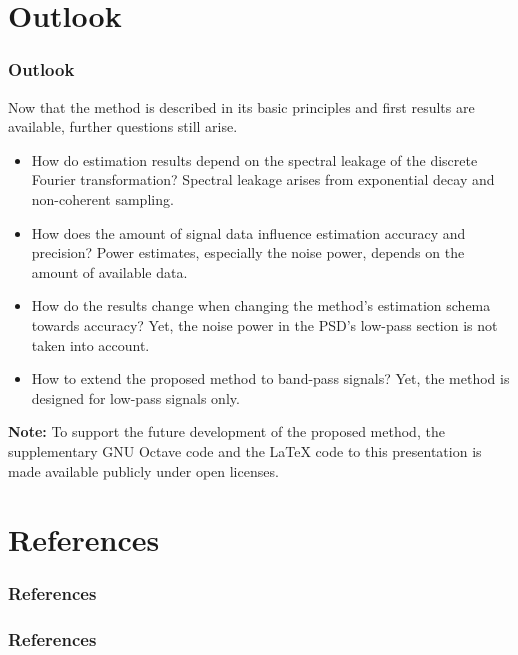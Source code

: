 \documentclass[11pt,aspectratio=169]{beamer}
\begin{document}
	\section{Outlook}
	\begin{frame}
		\frametitle{Outlook}
		Now that the method is described in its basic principles and first results are available, further questions still arise.
		\begin{itemize}
			\item How do estimation results depend on the spectral leakage of the discrete Fourier transformation? Spectral leakage arises from exponential decay and non-coherent sampling.
			\item How does the amount of signal data influence estimation accuracy and precision? Power estimates, especially the noise power, depends on the amount of available data.
			\item How do the results change when changing the method's estimation schema towards accuracy? Yet, the noise power in the PSD's low-pass section is not taken into account.
			\item How to extend the proposed method to band-pass signals? Yet, the method is designed for low-pass signals only.
		\end{itemize}
		\vspace*{.5em}
		\small \textbf{Note:} To support the future development of the proposed method, the supplementary GNU Octave code\autocite{progcode} and the \LaTeX{} code\autocite{texcode} to this presentation is made available publicly under open licenses.
	\end{frame}
	\section*{References}
	\begin{frame}[noframenumbering]
		\frametitle{References}
		\printbibliography[type={online},title={References \textendash{} Online Resources}]
	\end{frame}
	\begin{frame}[noframenumbering]
		\frametitle{References}
		\printbibliography[type={dataset},title={References \textendash{} Datasets}]
	\end{frame}
	\appendix
\end{document}
